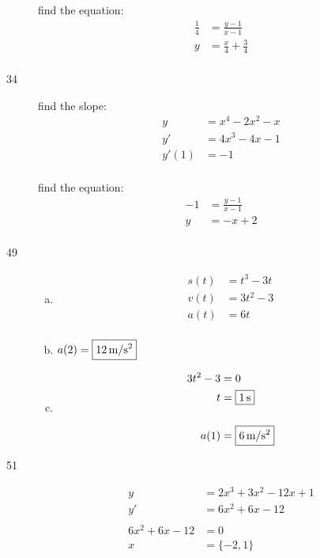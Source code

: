 \documentclass[letterpaper, landscape]{exam}
\begin{document}
\begin{description}
      find the equation:
      \begin{align*}
        \frac{1}{4} & = \frac{y - 1}{x - 1} \\
        y           & = \boxed{ \frac{x}{4} + \frac{3}{4} } \\
      \end{align*}

    \item[34] 
      find the slope: 
      \begin{align*}
        y     & = x^4 - 2x^2 - x \\
        y'    & = 4x^3 - 4x - 1 \\
        y'(1) & = -1 \\
      \end{align*}

      find the equation:
      \begin{align*}
        -1 & = \frac{y - 1}{x - 1} \\
        y  & = \boxed{ -x + 2 } \\
      \end{align*}
      
    \item[49]
      \begin{enumerate}[(a)]
        \item 
          \begin{align*}
            s(t) &= t^3 - 3t \\
            v(t) &= 3t^2 - 3 \\
            a(t) &= 6t \\
          \end{align*}

        \item $a(2) = \boxed{ \unit[12]{m/s^2} }$

        \item
          \begin{align*}
            3t^2 - 3 & = 0 \\
            t        & = \boxed{ \unit[1]{s} } \\
            \\
            a(1)     & = \boxed{ \unit[6]{m/s^2} } \\
          \end{align*}

      \end{enumerate}

    \item[51]
      \begin{align*}
        y              & = 2x^3 + 3x^2 - 12x + 1 \\
        y'             & = 6x^2 + 6x - 12 \\
        \\
        6x^2 + 6x - 12 & = 0 \\
        x              & = \{ -2, 1 \} \\
      \end{align*}


\end{description}
\end{document}
